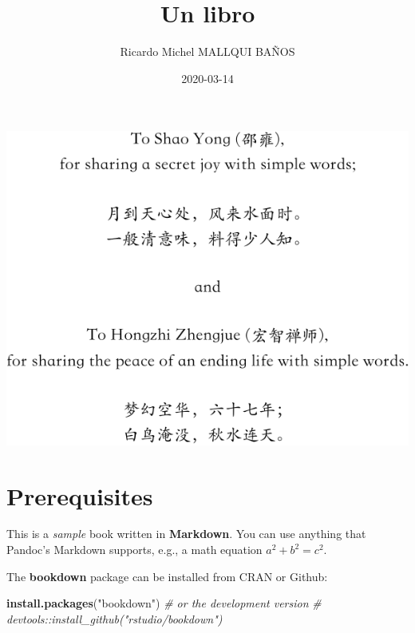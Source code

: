 \documentclass[]{krantz}
\title{Un libro}
\author{Ricardo Michel MALLQUI BAÑOS}
\date{2020-03-14}
\makeatletter
\newenvironment{Shaded}{\begin{snugshade}}{\end{snugshade}}
\newcommand{\CommentTok}[1]{\textcolor[rgb]{0.37,0.37,0.37}{\textit{#1}}}
\newcommand{\KeywordTok}[1]{\textcolor[rgb]{0.27,0.27,0.27}{\textbf{#1}}}
\newcommand{\NormalTok}[1]{#1}
\newcommand{\StringTok}[1]{\textcolor[rgb]{0.5,0.5,0.5}{#1}}
\renewcommand*{\cleardoublepage}{\clearpage\if@twoside \ifodd\c@page\else
	\hbox{}%
	\thispagestyle{empty}%
	\newpage%
	\if@twocolumn\hbox{}\newpage\fi\fi\fi}
\makeatother
\begin{document}
\maketitle

\thispagestyle{empty}
\begin{center}
\includegraphics{dedication.pdf}
\end{center}

\setlength{\abovedisplayskip}{-5pt}
\setlength{\abovedisplayshortskip}{-5pt}

{
\setcounter{tocdepth}{1}
\tableofcontents
}
\hypertarget{ID}{%
\chapter*{Prerequisites}\label{ID}}

This is a \emph{sample} book written in \textbf{Markdown}. You can use anything that Pandoc's Markdown supports, e.g., a math equation \(a^2 + b^2 = c^2\).

The \textbf{bookdown} package can be installed from CRAN or Github:

\begin{Shaded}
\begin{Highlighting}[]
\KeywordTok{install.packages}\NormalTok{(}\StringTok{"bookdown"}\NormalTok{)}
\CommentTok{# or the development version}
\CommentTok{# devtools::install_github("rstudio/bookdown")}
\end{Highlighting}
\end{Shaded}
\end{document}
